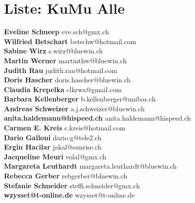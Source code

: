 \documentclass{scrartcl}
\begin{document}
\section*{Liste: KuMu Alle}
\textbf{Eveline Schueep } eve.sch@gmx.ch\\
\textbf{Wilfried Betschart } betschw@hotmail.com\\
\textbf{Sabine Wirz } s.wirz@bluewin.ch\\
\textbf{Martin Werner } martinthw@bluewin.ch\\
\textbf{Judith Rau } judith.rau@hotmail.com\\
\textbf{Doris Hascher } doris.hascher@bluewin.ch\\
\textbf{Claudia Krepelka } clkrwa@gmail.com\\
\textbf{Barbara Kellenberger } b.kellenberger@unibas.ch\\
\textbf{Andreas Schweizer } a.j.schweizer@bluewin.ch\\
\textbf{anita.haldemann@hispeed.ch } anita.haldemann@hispeed.ch\\
\textbf{Carmen E. Kreis } c.kreis@hotmail.com\\
\textbf{Dario Galloni } dario.g@tele2.ch\\
\textbf{Ergin Hacilar } jakal@sunrise.ch\\
\textbf{Jacqueline Meuri } volal@gmx.ch\\
\textbf{Margareta Leuthardt } margareta.leuthardt@bluewin.ch\\
\textbf{Rebecca Gerber } rebgerber@bluewin.ch\\
\textbf{Stefanie Schneider } steffi.schneider@gmx.ch\\
\textbf{wzysset@t-online.de } wzysset@t-online.de\\
\end{document}
